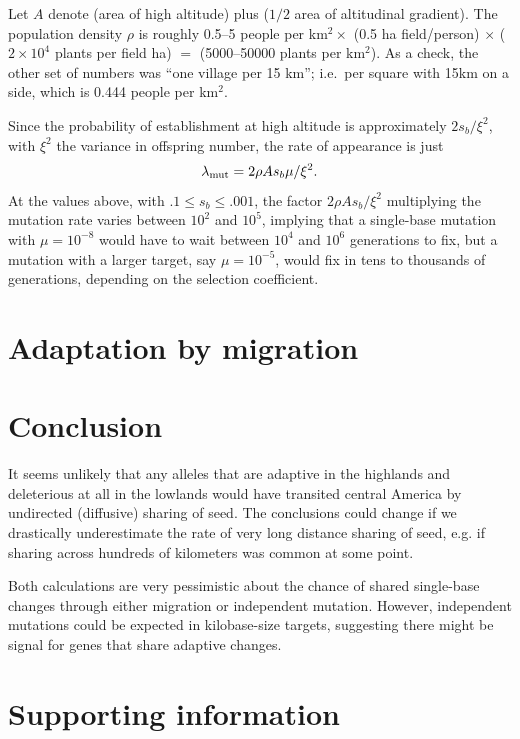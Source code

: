 Let $A$ denote (area of high altitude) plus ($1/2$ area of altitudinal gradient).
The population density $\rho$ is roughly 0.5--5 people per km$^2 \times$ (0.5 ha field/person) $\times$ ($2\times10^4$ plants per field ha) $=$ (5000--50000 plants per km$^2$).
As a check, the other set of numbers was ``one village per 15 km''; i.e.\ per square with 15km on a side, which is 0.444 people per km$^2$.

Since the probability of establishment at high altitude is approximately $2 s_b / \xi^2$, 
with $\xi^2$ the variance in offspring number,
the rate of appearance is just 
\begin{align*}
  \lambda_{\text{mut}} = 2 \rho A s_b \mu / \xi^2 .
\end{align*}
At the values above, with $.1 \le s_b \le .001$, the factor $2 \rho A s_b / \xi^2$ multiplying the mutation rate
varies between $10^2$ and $10^5$,
implying that a single-base mutation with $\mu=10^{-8}$ would have to wait between $10^4$ and $10^6$ generations to fix,
but a mutation with a larger target, say $\mu=10^{-5}$, would fix in tens to thousands of generations, depending on the selection coefficient.



\section{Adaptation by migration}

\section{Conclusion}
It seems unlikely that any alleles that are adaptive in the highlands and deleterious at all in the lowlands
would have transited central America by undirected (diffusive) sharing of seed.
The conclusions could change if we drastically underestimate the rate of very long distance sharing of seed,
e.g. if sharing across hundreds of kilometers was common at some point.

Both calculations are very pessimistic about the chance of shared single-base changes through either migration or independent mutation.
However, independent mutations could be expected in kilobase-size targets,
suggesting there might be signal for genes that share adaptive changes.


\newpage
\suppl
\section*{Supporting information}

